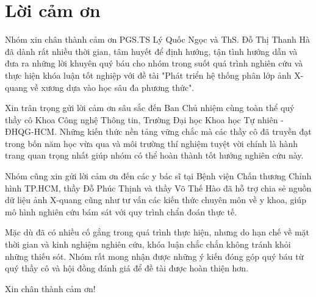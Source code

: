 \chapter*{Lời cảm ơn}
\label{thanks}

Nhóm xin chân thành cảm ơn PGS.TS Lý Quốc Ngọc và ThS. Đỗ Thị Thanh Hà đã dành rất nhiều thời gian, 
tâm huyết để định hướng, tận tình hướng dẫn và đưa ra những lời khuyên quý báu cho nhóm trong 
suốt quá trình nghiên cứu và thực hiện khóa luận tốt nghiệp với đề tài 
"Phát triển hệ thống phân lớp ảnh X-quang về xương dựa vào học sâu đa phương thức". 

Xin trân trọng gửi lời cảm ơn sâu sắc đến Ban Chủ nhiệm cùng toàn thể quý thầy cô Khoa Công nghệ Thông tin, 
Trường Đại học Khoa học Tự nhiên - ĐHQG-HCM. Những kiến thức nền tảng vững chắc mà các thầy cô 
đã truyền đạt trong bốn năm học vừa qua và môi trường thí nghiệm tuyệt vời chính là hành trang quan trọng 
nhất giúp nhóm có thể hoàn thành tốt hướng nghiên cứu này.

Nhóm cũng xin gửi lời cảm ơn đến các y bác sĩ tại Bệnh viện Chấn thương Chỉnh hình TP.HCM, 
thầy Đỗ Phúc Thịnh và thầy Võ Thế Hào đã hỗ trợ chia sẻ nguồn dữ liệu ảnh X-quang 
cũng như tư vấn các kiến thức chuyên môn về y khoa, giúp mô hình nghiên cứu bám sát với quy trình 
chẩn đoán thực tế.

Mặc dù đã có nhiều cố gắng trong quá trình thực hiện, nhưng do hạn chế về mặt thời gian và 
kinh nghiệm nghiên cứu, khóa luận chắc chắn không tránh khỏi những thiếu sót. 
Nhóm rất mong nhận được những ý kiến đóng góp quý báu từ quý thầy cô và hội đồng đánh giá để 
đề tài được hoàn thiện hơn.

Xin chân thành cảm ơn!
